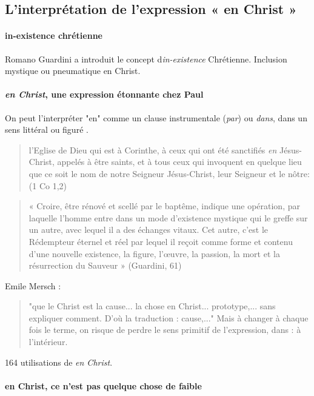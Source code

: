  \subsection{L’interprétation de l’expression  « en Christ » }
 \paragraph{in-existence chrétienne}
 Romano Guardini a introduit le concept d\textit{in-existence} Chrétienne. Inclusion mystique ou pneumatique en Christ. 
 
 \paragraph{\textit{en Christ}, une expression étonnante chez Paul} On peut l'interpréter "en" comme un clause instrumentale (\textit{par}) ou \textit{dans}, dans un sens littéral ou figuré .
  
 \begin{quote}
      l'Eglise de Dieu qui est à Corinthe, à ceux qui ont été sanctifiés \textit{en} Jésus-Christ, appelés à être saints, et à tous ceux qui invoquent en quelque lieu que ce soit le nom de notre Seigneur Jésus-Christ, leur Seigneur et le nôtre: (1 Co 1,2)
 \end{quote}

 
 \begin{quote}
     « Croire, être rénové et scellé par le baptême, indique une opération, par laquelle l’homme entre dans un mode d’existence mystique qui le greffe sur un autre, avec lequel il a des échanges vitaux. Cet autre, c’est le Rédempteur éternel et réel par lequel il reçoit comme forme et contenu d’une nouvelle existence, la figure, l’œuvre, la passion, la mort et la résurrection du Sauveur » (Guardini, 61)
 \end{quote}

Emile Mersch : 
\begin{quote}
    "que le Christ est la cause... la chose en Christ... prototype,... sans expliquer comment. D'où la traduction : cause,..."
    Mais à changer à chaque fois le terme, on risque de perdre le sens primitif de l'expression, dans : à l'intérieur. 
\end{quote}
 
 164 utilisations de \textit{en Christ}.
 
 \paragraph{en Christ, ce n'est pas quelque chose de faible}
 

